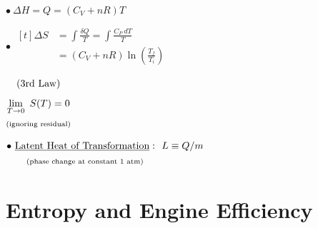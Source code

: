 \documentclass[12pt]{article}
\begin{document}
\begin{minipage}[t]{.49\textwidth}
    \vspace{1pt}
    \(\bullet \ \boxed{ \Delta H = Q = (C_V + nR) T }\)
    
    \vspace{15pt}
    \(\bullet \ \boxed{ \begin{aligned}[t]
            \Delta S &= \int \frac{\delta Q}{T} = \int \frac{C_P\ dT}{T} \\[5pt]
            &= (C_V + nR) \ln{ \left( \frac{T_f}{T_i} \right) } 
        \end{aligned} } 
    \) 
    \hspace{5pt} \begin{minipage}[t]{75pt}
        \(\begin{gathered}[t]
            \text{(3rd Law)}\\[5pt]
            \lim_{T \rightarrow 0}\ S(T) = 0\\
            \text{\scriptsize(ignoring residual)}
        \end{gathered}\)
    \end{minipage}

    \vspace{15pt}
    \(\bullet\ \begin{gathered}[t]
        \text{\underline{Latent Heat of Transformation}}:\\
        \text{\scriptsize(phase change at constant 1 atm)}
    \end{gathered} \ \ L \equiv Q/m\) 
\end{minipage}

\par\vspace{20pt}\noindent


\newpage
\section{Entropy and Engine Efficiency}
\end{document}
